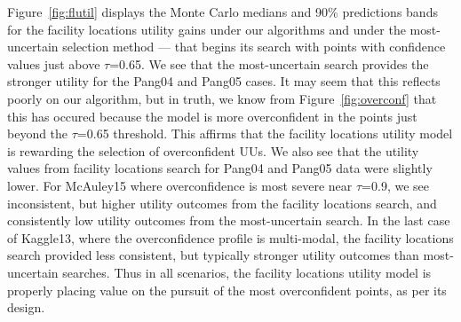 \documentclass[letterpaper]{article} %
\newcommand{\km}[1]{{\color{red} #1}} %
\begin{document}
\km{Figure~\ref{fig:flutil} displays the Monte Carlo medians and 90\% predictions bands for the facility locations utility gains under our algorithms and under the most-uncertain selection method --- that begins its search with points with confidence values just above $\tau$=0.65.  We see that the most-uncertain search provides the stronger utility for the Pang04 and Pang05 cases. It may seem that this reflects poorly on our algorithm, but in truth, we know from Figure~\ref{fig:overconf} that this has occured because the model is more overconfident in the points just beyond the $\tau$=0.65 threshold. This affirms that the facility locations utility model is rewarding the selection of overconfident UUs. We also see that the utility values from facility locations search for Pang04 and Pang05 data were slightly lower. For McAuley15 where overconfidence is most severe near $\tau$=0.9, we see inconsistent, but higher utility outcomes from the facility locations search, and consistently low utility outcomes from the most-uncertain search. In the last case of Kaggle13, where the overconfidence profile is multi-modal, the facility locations search provided less consistent, but typically stronger utility outcomes than most-uncertain searches. Thus in all scenarios, the facility locations utility model is properly placing value on the pursuit of the most overconfident points, as per its design.}

\end{document}
